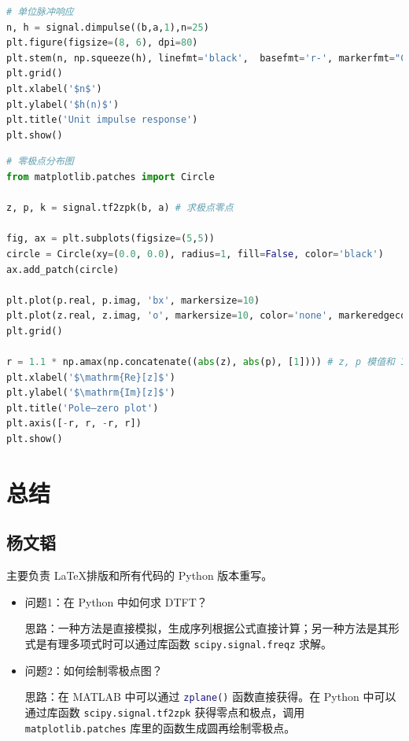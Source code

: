 \documentclass[12pt,AutoFakeBold]{article}
\begin{document}
\begin{lstlisting}[language=Python]
# 单位脉冲响应
n, h = signal.dimpulse((b,a,1),n=25)
plt.figure(figsize=(8, 6), dpi=80)
plt.stem(n, np.squeeze(h), linefmt='black',  basefmt='r-', markerfmt="C0o")
plt.grid()
plt.xlabel('$n$')
plt.ylabel('$h(n)$')
plt.title('Unit impulse response')
plt.show()
\end{lstlisting}

\begin{lstlisting}[language=Python]
# 零极点分布图
from matplotlib.patches import Circle

z, p, k = signal.tf2zpk(b, a) # 求极点零点

fig, ax = plt.subplots(figsize=(5,5))
circle = Circle(xy=(0.0, 0.0), radius=1, fill=False, color='black')
ax.add_patch(circle)

plt.plot(p.real, p.imag, 'bx', markersize=10)
plt.plot(z.real, z.imag, 'o', markersize=10, color='none', markeredgecolor='b')
plt.grid()

r = 1.1 * np.amax(np.concatenate((abs(z), abs(p), [1]))) # z, p 模值和 1 的最大值乘以 1.1
plt.xlabel('$\mathrm{Re}[z]$')
plt.ylabel('$\mathrm{Im}[z]$')
plt.title('Pole–zero plot')
plt.axis([-r, r, -r, r])
plt.show()
\end{lstlisting}

\section{总结}

\subsection{杨文韬}

主要负责 \LaTeX 排版和所有代码的 Python 版本重写。

\begin{itemize}
\item 问题1：在 Python 中如何求 DTFT？

思路：一种方法是直接模拟，生成序列根据公式直接计算；另一种方法是其形式是有理多项式时可以通过库函数 \lstinline[language=Python]|scipy.signal.freqz| 求解。
\item 问题2：如何绘制零极点图？

思路：在 MATLAB 中可以通过 \lstinline[language=Matlab]|zplane()| 函数直接获得。在 Python 中可以通过库函数 \lstinline[language=Python]|scipy.signal.tf2zpk| 获得零点和极点，调用 \lstinline[language=Python]|matplotlib.patches| 库里的函数生成圆再绘制零极点。
\end{itemize}
\end{document}
